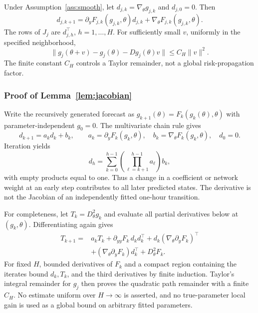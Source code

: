 \begin{lemma}
\label{lem:jacobian}
Under Assumption~\ref{ass:smooth}, let $d_{j,k}=\nabla_\theta g_{j,k}$ and $d_{j,0}=0$. Then
\begin{equation}
 d_{j,k+1}
 =\partial_y F_{j,k}(g_{j,k},\theta)d_{j,k}
   +\nabla_\theta F_{j,k}(g_{j,k},\theta).
 \label{eq:full_jacobian}
\end{equation}
The rows of $J_j$ are $d_{j,h}^\top$, $h=1,\ldots,H$. For sufficiently small $v$, uniformly in the specified neighborhood,
\[
 \|g_j(\theta+v)-g_j(\theta)-Dg_j(\theta)v\|
 \le C_H\|v\|^2.
\]
The finite constant $C_H$ controls a Taylor remainder, not a global risk-propagation factor.
\end{lemma}

\subsubsection{Proof of Lemma~\ref{lem:jacobian}}
Write the recursively generated forecast as $g_{k+1}(\theta)=F_k(g_k(\theta),\theta)$ with parameter-independent $g_0=0$. The multivariate chain rule gives
\[
 d_{k+1}=a_kd_k+b_k,\qquad
 a_k=\partial_yF_k(g_k,\theta),\quad
 b_k=\nabla_\theta F_k(g_k,\theta),\quad d_0=0.
\]
Iteration yields
\[
 d_h=\sum_{k=0}^{h-1}\left(\prod_{\ell=k+1}^{h-1}a_\ell\right)b_k,
\]
with empty products equal to one. Thus a change in a coefficient or network weight at an early step contributes to all later predicted states. The derivative is not the Jacobian of an independently fitted one-hour transition.

For completeness, let $T_k=D_\theta^2g_k$ and evaluate all partial derivatives below at $(g_k,\theta)$. Differentiating again gives
\begin{equation}
 \begin{split}
 T_{k+1}={}&a_kT_k+\partial_{yy}F_k\,d_kd_k^\top
  +d_k(\nabla_\theta\partial_yF_k)^\top\\
 &+(\nabla_\theta\partial_yF_k)d_k^\top
   +D_\theta^2F_k.
 \end{split}
 \label{eq:path_hessian}
\end{equation}
For fixed $H$, bounded derivatives of $F_k$ and a compact region containing the iterates bound $d_k,T_k$, and the third derivatives by finite induction. Taylor's integral remainder for $g_j$ then proves the quadratic path remainder with a finite $C_H$. No estimate uniform over $H\to\infty$ is asserted, and no true-parameter local gain is used as a global bound on arbitrary fitted parameters.

